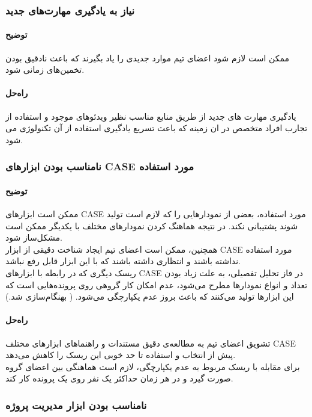 \subsubsection{نیاز به یادگیری مهارت‌های جدید}
\paragraph{توضیح}
ممکن است لازم شود اعضای تیم موارد جدیدی را یاد بگیرند که باعث نادقیق بودن تخمین‌های زمانی شود.
\paragraph{راه‌حل}
یادگیری مهارت های جدید از طریق منابع مناسب نظیر ویدئوهای موجود و استفاده از تجارب افراد متخصص در ان زمینه که باعث تسریع یادگیری استفاده از آن تکنولوژی می شود.
\subsubsection{نامناسب بودن ابزارهای CASE مورد استفاده}
\paragraph{توضیح}
ممکن است ابزارهای CASE مورد استفاده، بعضی از نمودارهایی را که لازم است تولید شوند پشتیبانی نکند. در نتیجه هماهنگ کردن نمودارهای مختلف با یکدیگر ممکن است مشکل‌ساز شود.\\
همچنین، ممکن است اعضای تیم ایجاد شناخت دقیقی از ابزار CASE مورد استفاده نداشته باشند و انتظاری داشته باشند که با این ابزار قابل رفع نباشد. \\
ریسک دیگری که در رابطه با ابزارهای CASE در فاز تحلیل تفصیلی، به علت زیاد بودن تعداد و انواع نمودارها مطرح می‌شود، عدم امکان کار گروهی روی پرونده‌هایی است که این ابزارها تولید می‌کنند که باعث بروز عدم یکپارچگی می‌شود. ({\color{red} بهنگام‌سازی شد.})

\paragraph{راه‌حل}
تشویق اعضای تیم به مطالعه‌ی دقیق مستندات و 
راهنماهای ابزارهای مختلف CASE پیش از انتخاب و استفاده تا حد خوبی این ریسک را کاهش می‌دهد. \\
برای مقابله با ریسک مربوط به عدم یکپارچگی، لازم است هماهنگی بین اعضای گروه صورت گیرد و در هر زمان حداکثر یک نفر روی یک پرونده کار کند.
\subsubsection{نامناسب بودن ابزار مدیریت پروژه}
